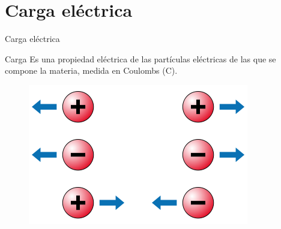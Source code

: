 \documentclass[10pt]{beamer}
\begin{document}


\section{Carga eléctrica}
\begin{frame}{Carga eléctrica}{}

\begin{block}{Carga}
Es una propiedad eléctrica de las partículas eléctricas de las que se compone la materia, medida en Coulombs (C).
\end{block}

\begin{figure}[h!]
\centering
\includegraphics [scale=0.32]{charges}
\label{fig:cargas}
\end{figure}

\end{frame}
\end{document}
